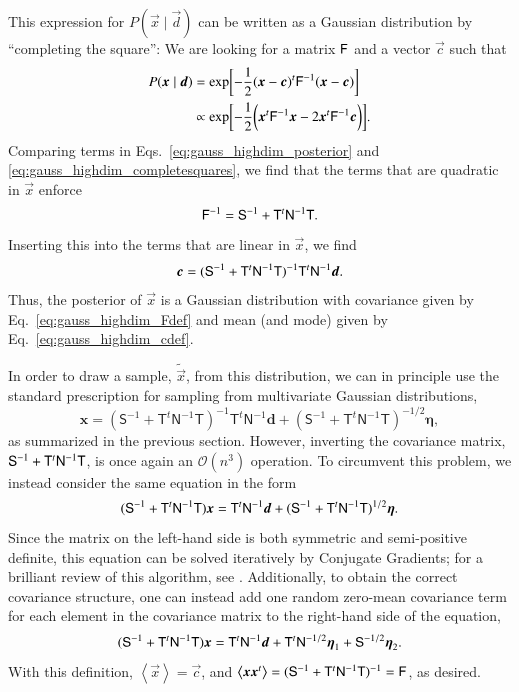 \documentclass[onecolumn]{aa}
\renewcommand{\d}[0]{\vec{d}}
\newcommand{\x}[0]{\vec{x}}
\newcommand{\F}[0]{\tens{F}}
\newcommand{\T}[0]{\tens{T}}
\newcommand{\N}[0]{\tens{N}}
\renewcommand{\S}[0]{\tens{S}}
\begin{document}
This expression for $P(\x\mid \d)$ can be written as a Gaussian
distribution by ``completing the square'': We are looking for a matrix
$\F$ and a vector $\vec{c}$ such that
\begin{align}
    P(\x\mid \d) &= \exp\biggl[-\frac{1}{2}(\x - \vec{c})^t\F^{-1}(\x - \vec{c})\biggr] \nonumber \\
             &\propto \exp\biggl[-\frac{1}{2}\biggl(\x^t\F^{-1}\x - 2\x^t\F^{-1}\vec{c}\biggr)\biggr].
    \label{eq:gauss_highdim_completesquares}
\end{align}
Comparing terms in Eqs.~\eqref{eq:gauss_highdim_posterior} and \eqref{eq:gauss_highdim_completesquares}, we find that the terms that are quadratic in $\x$ enforce
\begin{equation}
    \F^{-1} = \S^{-1} + \T^t\N^{-1}\T.
    \label{eq:gauss_highdim_Fdef}
\end{equation}
Inserting this into the terms that are linear in $\x$, we find
\begin{equation}
                       \vec{c} = (\S^{-1}+ \T^t\N^{-1}\T)^{-1}\T^t\N^{-1}\d.
    \label{eq:gauss_highdim_cdef}
\end{equation}
Thus, the posterior of $\x$ is a Gaussian distribution with covariance
given by Eq.~\eqref{eq:gauss_highdim_Fdef} and mean (and mode) given by
Eq.~\eqref{eq:gauss_highdim_cdef}.

In order to draw a sample, $\tilde{\x}$, from this distribution, we
can in principle use the standard prescription for sampling from
multivariate Gaussian distributions, 
\begin{equation}
	\boldsymbol x=(\mathsf S^{-1}+\mathsf T^t\mathsf N^{-1}\mathsf T)^{-1}
	\mathsf T^t\mathsf N^{-1}\boldsymbol d+(\mathsf S^{-1}+\mathsf T^t\mathsf N^{-1}\mathsf T)^{-1/2}\boldsymbol\eta,
\end{equation}
as summarized in the previous
section. However, inverting the covariance matrix, $\S^{-1}+
\T^t\N^{-1}\T$, is once again an $\mathcal{O}(n^3)$ operation. To
circumvent this problem, we instead consider the same equation in the
form
\begin{equation}
  (\S^{-1} + \T^t\N^{-1}\T)\x = \T^t\N^{-1}\d
	+(\mathsf S^{-1}+\mathsf T^t\mathsf N^{-1}\mathsf T)^{1/2}\boldsymbol\eta.
  \label{eq:gauss_highdim_cdef_linsys}
\end{equation}
Since the matrix on the left-hand side is both symmetric and
semi-positive definite, this equation can be solved iteratively by
Conjugate Gradients; for a brilliant review of this algorithm, see
\citet{shewchuk:1994}. Additionally, to obtain the correct covariance
structure, one can instead add one random zero-mean covariance term for
each element in the covariance matrix to the right-hand side of the
equation,
\begin{equation}
    (\S^{-1} + \T^t\N^{-1}\T)\x = \T^t\N^{-1}\d + \T^t\N^{-1/2}\vec{\eta}_1 +
    \S^{-1/2}\vec{\eta}_2. 
    \label{eq:multigauss}
\end{equation}
With this definition, $\left<\x\right> = \vec{c}$,
and $\left<\x\x^t\right> = (\S^{-1} + \T^t\N^{-1}\T)^{-1} = \F$, as desired.
\end{document}
